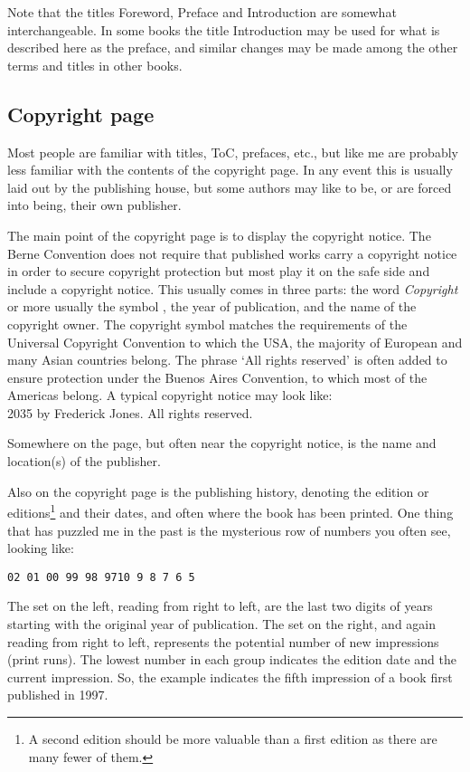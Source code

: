 \documentclass[10pt,letterpaper]{memoir}
\newcommand{\prtoc}{ToC}             %
\newcommand{\ixtoc}{\index{ToC}}     %
\newcommand{\toc}{\prtoc\ixtoc}      %
\begin{document}
    Note that the titles Foreword, Preface and Introduction are somewhat
interchangeable. In some books the title Introduction may be used for what
is described here as the preface, and similar changes may be made among the 
other terms and titles in other books. 

\subsection{Copyright page}

    Most people are familiar with titles, \toc, prefaces, etc., but like
me are probably
less familiar with the contents of the copyright page. 
In any event this is
usually laid out by the publishing house, but some authors may like to be,
or are forced into being, their own publisher.

    The main point of the copyright page is to display the 
copyright notice.
The Berne Convention does not require that published works carry a copyright
notice in order to secure copyright protection but most play it on the safe
side and include a copyright notice.
This usually comes in three parts: the word \textit{Copyright} or more usually
the symbol \textcopyright, 
the year of publication, 
and the name of the copyright owner.
The copyright symbol matches the requirements of the Universal Copyright
Convention to which the USA, the majority of European and many Asian
countries belong.
The phrase `All rights reserved' is often added to ensure protection under the
Buenos Aires Convention, to which most of the Americas belong. A typical
copyright notice may look like: \\
{\footnotesize \textcopyright{} 2035 by Frederick Jones. All rights reserved.}

    Somewhere on the page, but often near the copyright notice, is the name 
and location(s) of the publisher.

    Also on the copyright page is the publishing history, denoting the edition
or editions\footnote{A second edition should be more valuable than a first
edition as there are many fewer of them.} and their dates, 
and often where the book has been printed. One thing that has puzzled me in
the past is the mysterious row of numbers you often see, looking like: \\
\centerline{\footnotesize\texttt{02 01 00 99 98 97\hspace{2em}10 9 8 7 6 5}}
The set on the left, reading from right to left, are the last two digits
of years starting with the original year of publication.
The set on the right, and again reading from right to left, represents the
potential number of new impressions (print runs). The lowest number in each 
group indicates the edition date and the current impression. So, the example
indicates the fifth impression of a book first published in 1997.
\end{document}
